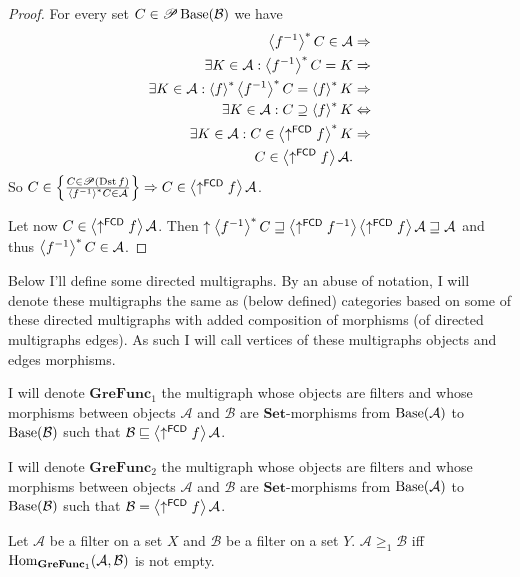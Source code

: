 \begin{proof}
For every set $C\in\mathscr{P}\operatorname{Base}(\mathcal{B})$ we have
\begin{align*}
\left\langle f^{-1}\right\rangle ^{\ast}C\in\mathcal{A} & \Rightarrow\\
\exists K\in\mathcal{A}:\left\langle f^{-1}\right\rangle ^{\ast}C=K & \Rightarrow\\
\exists K\in\mathcal{A}:\left\langle f\right\rangle ^{\ast}\left\langle f^{-1}\right\rangle ^{\ast}C=\left\langle f\right\rangle ^{\ast}K & \Rightarrow\\
\exists K\in\mathcal{A}:C\supseteq\left\langle f\right\rangle ^{\ast}K & \Leftrightarrow\\
\exists K\in\mathcal{A}:C\in\left\langle \uparrow^{\mathsf{FCD}}f\right\rangle ^{\ast}K & \Rightarrow\\
C\in\left\langle \uparrow^{\mathsf{FCD}}f\right\rangle\mathcal{A}.
\end{align*}
So $C\in \left\{ \frac{C\in\mathscr{P}(\operatorname{Dst} f)}{\left\langle f^{-1}\right\rangle ^{\ast}C\in\mathcal{A}}\right\}\Rightarrow C\in\left\langle \uparrow^{\mathsf{FCD}}f\right\rangle\mathcal{A}$.

Let now $C\in\left\langle \uparrow^{\mathsf{FCD}}f\right\rangle\mathcal{A}$. Then
$\uparrow\left\langle f^{-1}\right\rangle ^{\ast}C\sqsupseteq\left\langle \uparrow^{\mathsf{FCD}}f^{-1}\right\rangle\left\langle \uparrow^{\mathsf{FCD}}f\right\rangle\mathcal{A}\sqsupseteq\mathcal{A}$
and thus $\left\langle f^{-1}\right\rangle ^{\ast}C\in\mathcal{A}$.
\end{proof}
Below I'll define some directed multigraphs. By an abuse of notation,
I will denote these multigraphs the same as (below defined) categories
based on some of these directed multigraphs with added composition
of morphisms (of directed multigraphs edges). As such I will call
vertices of these multigraphs objects and edges morphisms.
\begin{defn}
I will denote $\mathbf{GreFunc}{}_{1}$ the multigraph whose objects
are filters and whose morphisms between objects $\mathcal{A}$ and
$\mathcal{B}$ are $\mathbf{Set}$-morphisms from $\operatorname{Base}(\mathcal{A})$
to $\operatorname{Base}(\mathcal{B})$ such that $\mathcal{B}\sqsubseteq\left\langle \uparrow^{\mathsf{FCD}}f\right\rangle\mathcal{A}$.
\end{defn}

\begin{defn}
I will denote $\mathbf{GreFunc}{}_{2}$ the multigraph whose objects
are filters and whose morphisms between objects $\mathcal{A}$ and
$\mathcal{B}$ are $\mathbf{Set}$-morphisms from $\operatorname{Base}(\mathcal{A})$
to $\operatorname{Base}(\mathcal{B})$ such that $\mathcal{B}=\left\langle \uparrow^{\mathsf{FCD}}f\right\rangle\mathcal{A}$.
\end{defn}

\begin{defn}
Let $\mathcal{A}$ be a filter on a set $X$ and $\mathcal{B}$ be
a filter on a set $Y$. $\mathcal{A}\ge_{1}\mathcal{B}$ iff $\operatorname{Hom}_{\mathbf{GreFunc}_{1}}(\mathcal{A},\mathcal{B})$
is not empty.
\end{defn}

